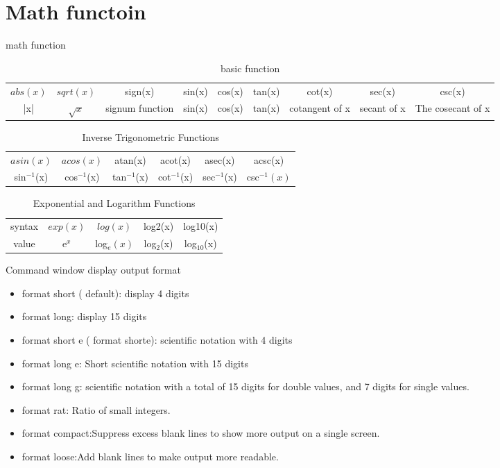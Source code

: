 \documentclass[aspectratio=169]{beamer}
\begin{document}
\section{Math functoin}
\begin{frame}{math function}
\begin{table}
  \centering
  \tiny
  \begin{tabularx}{\linewidth}{ccccccccc}\toprule
    $abs(x)$&$sqrt(x)$& sign(x)& sin(x) & cos(x)& tan(x) & cot(x)& sec(x) & csc(x)\\
   
    |x|& $\sqrt{x}$ &signum function& sin(x) & cos(x) & tan(x)& cotangent of x& secant of x& The cosecant of x\\\bottomrule
  \end{tabularx}
  \caption{basic function}
\end{table}

\begin{table}
  \begin{tabularx}{\linewidth}{cccccc}\toprule
    $asin(x)$&$acos(x)$& atan(x) & acot(x)& asec(x) & acsc(x)\\
   
     sin$^{-1}$(x) & cos$^{-1}$(x) & tan$^{-1}$(x)& cot$^{-1}$(x)& sec$^{-1}$(x)&csc$^{-1}(x)$\\\bottomrule
   \end{tabularx}
   \caption{Inverse Trigonometric Functions}
   \end{table}
   \begin{table}
     \centering
   \begin{tabularx}{\linewidth}{ccccc}\toprule
   syntax& $exp(x)$&$log(x)$& log2(x) & log10(x)\\
   
     value&e$^{x}$ & log$_{e}(x)$ & log$_{2}$(x)& log$_{10}$(x)\\\bottomrule
   \end{tabularx}
   \caption{   Exponential and Logarithm Functions}
   \end{table}
 \end{frame}
 \begin{frame}{Command window display output format}
   \begin{itemize}
     \item format short ( default): display 4 digits
           
     \item format long: display 15 digits
     \item format short e ( format shorte): scientific notation with 4 digits 
      \item            format long e: Short scientific notation with 15 digits
     \item format long g: scientific notation with a total of 15 digits for double values, and 7 digits for single values.
     \item format rat: Ratio of small integers.
     \item format compact:Suppress excess blank lines to show more output on a single screen.
     \item format loose:Add blank lines to make output more readable.
   \end{itemize}
 \end{frame}
\end{document}
